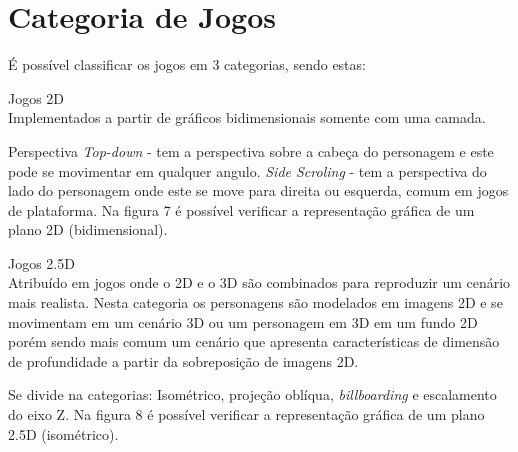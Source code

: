 \section{Categoria de Jogos}
\label{sec:categoria-de-jogos}

É possível classificar os jogos em 3 categorias, sendo estas:
\begin{alineascomponto}

\item Jogos 2D\\
Implementados a partir de gráficos bidimensionais somente com uma camada.

 Perspectiva \textit{ Top-down} - tem a perspectiva sobre a cabeça do personagem e este pode se movimentar em qualquer angulo.
 \textit{Side Scroling} - tem a perspectiva do lado do personagem onde este se move para direita ou esquerda, comum em jogos de plataforma. Na figura 7 é possível verificar a representação gráfica de um plano 2D (bidimensional). \cite{graf}

\end{alineascomponto}


\begin{figure}[h!]
		\centering
	\end{figure}

\begin{alineascomponto}


\item Jogos 2.5D\\
Atribuído em jogos onde o 2D e o 3D são combinados para reproduzir um cenário mais realista. Nesta categoria os personagens são modelados em imagens 2D e se movimentam em um cenário 3D ou um personagem em 3D em um fundo 2D porém sendo mais comum um cenário que apresenta características de dimensão de profundidade a partir da sobreposição de imagens 2D.

Se divide na categorias: Isométrico, projeção oblíqua, \textit{billboarding} e escalamento do eixo Z. Na figura 8 é possível verificar a representação gráfica de um plano 2.5D (isométrico). \cite{graf}

\end{alineascomponto}

